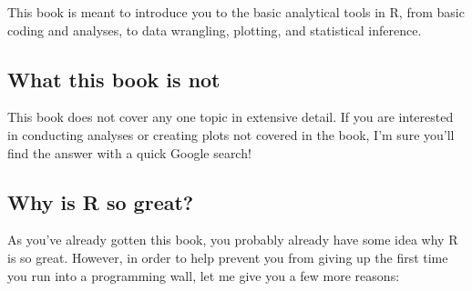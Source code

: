 \documentclass{tufte-book}\usepackage[]{graphicx}\usepackage[]{color}
\begin{document}
This book is meant to introduce you to the basic analytical tools in R, from basic coding and analyses, to data wrangling, plotting, and statistical inference.

\subsection{What this book is \textbf{not}}

This book does not cover any one topic in extensive detail. If you are interested in conducting analyses or creating plots not covered in the book, I'm sure you'll find the answer with a quick Google search!

\subsection{Why is R so great?}

As you've already gotten this book, you probably already have some idea why R is so great. However, in order to help prevent you from giving up the first time you run into a programming wall, let me give you a few more reasons:
\end{document}
